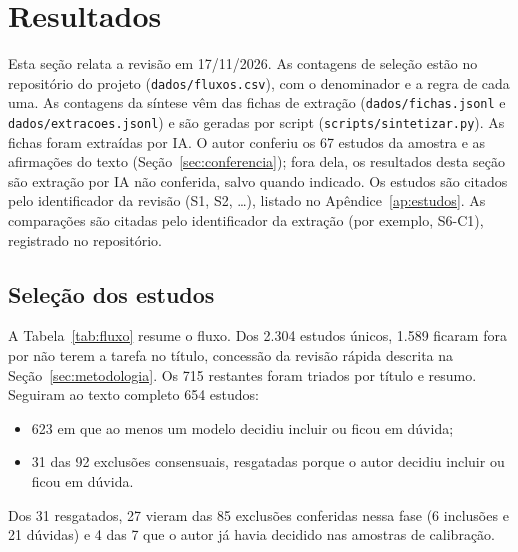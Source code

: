 \section{Resultados}\label{sec:resultados}
Esta seção relata a revisão em 17/11/2026. As contagens de seleção estão no repositório do projeto
(\texttt{dados/fluxos.csv}), com o denominador e a regra de cada uma. As contagens da síntese vêm das fichas de
extração (\texttt{dados/fichas.jsonl} e \texttt{dados/extracoes.jsonl}) e são geradas por script
(\texttt{scripts/sintetizar.py}). As fichas foram extraídas por IA. O autor conferiu os 67 estudos da amostra e as
afirmações do texto (Seção~\ref{sec:conferencia}); fora dela, os resultados desta seção são extração por IA
não conferida, salvo quando indicado. Os estudos são citados pelo identificador da revisão (S1, S2, \ldots), listado no
Apêndice~\ref{ap:estudos}. As comparações são citadas pelo identificador da extração (por exemplo, S6-C1), registrado
no repositório.

\subsection{Seleção dos estudos}
A Tabela~\ref{tab:fluxo} resume o fluxo. Dos 2.304 estudos únicos, 1.589 ficaram fora por não terem a tarefa no
título, concessão da revisão rápida descrita na Seção~\ref{sec:metodologia}. Os 715 restantes foram triados por
título e resumo. Seguiram ao texto completo 654 estudos:
\begin{itemize}
  \item 623 em que ao menos um modelo decidiu incluir ou ficou em dúvida;
  \item 31 das 92 exclusões consensuais, resgatadas porque o autor decidiu incluir ou ficou em dúvida.
\end{itemize}
Dos 31 resgatados, 27 vieram das 85 exclusões conferidas nessa fase (6 inclusões e 21 dúvidas) e 4 das 7 que o
autor já havia decidido nas amostras de calibração.

